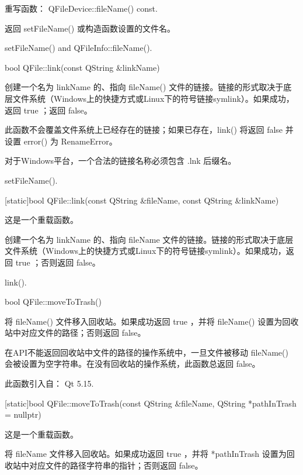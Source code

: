 重写函数： QFileDevice::fileName() const.

返回 setFileName() 或构造函数设置的文件名。


\begin{notice}[另请参阅]
setFileName() and QFileInfo::fileName().
\end{notice} 

bool QFile::link(const QString \&linkName)

创建一个名为 linkName 的、指向 fileName() 文件的链接。链接的形式取决于底层文件系统（Windows上的快捷方式或Linux下的符号链接symlink）。如果成功，返回 true ；返回 false。

此函数不会覆盖文件系统上已经存在的链接；如果已存在，link() 将返回 false 并设置 error() 为 RenameError。


\begin{notice}
对于Windows平台，一个合法的链接名称必须包含 .lnk 后缀名。
\end{notice} 


\begin{notice}[另请参阅]
setFileName().
\end{notice} 

[static]bool QFile::link(const QString \&fileName, const QString \&linkName)

这是一个重载函数。

创建一个名为 linkName 的、指向 fileName 文件的链接。链接的形式取决于底层文件系统（Windows上的快捷方式或Linux下的符号链接symlink）。如果成功，返回 true ；否则返回 false。



\begin{notice}[另请参阅]
link().
\end{notice} 

bool QFile::moveToTrash()

将 fileName() 文件移入回收站。如果成功返回 true ，并将 fileName() 设置为回收站中对应文件的路径；否则返回 false。
 

\begin{notice}
在API不能返回回收站中文件的路径的操作系统中，一旦文件被移动 fileName() 会被设置为空字符串。在没有回收站的操作系统，此函数总返回 false。
\end{notice} 

此函数引入自： Qt 5.15.

[static]bool QFile::moveToTrash(const QString \&fileName, QString *pathInTrash = nullptr)

这是一个重载函数。

将 fileName 文件移入回收站。如果成功返回 true ，并将 *pathInTrash 设置为回收站中对应文件的路径字符串的指针；否则返回 false。

